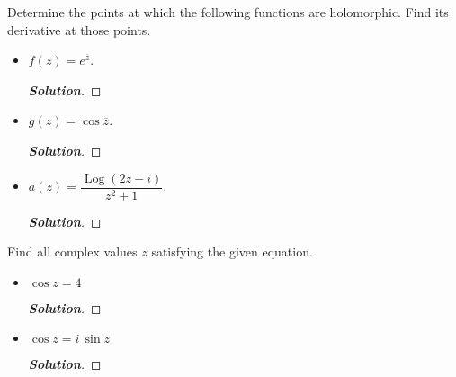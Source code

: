 \documentclass[11pt]{article}
\newenvironment{problem}[2][Problem\!]{\begin{trivlist}
\item[\hskip \labelsep {\bfseries #1}\hskip \labelsep {\bfseries #2}]}{\end{trivlist}}
\newenvironment{solution}{\begin{proof}[\textbf{\textit{Solution}}] }{\end{proof}}
\newcommand{\plog}{\operatorname{Log}}
\begin{document}
\newpage  %

\begin{problem}{5.4}
Determine the points at which the following functions are holomorphic. Find its derivative at those points.
\begin{itemize}[itemsep=3em]
\item[(a)] $f(z) = e^{\overline{z}}$.
\begin{solution}
\end{solution}

\item[(b)] $g(z) = \cos\overline{z}$.
\begin{solution}
\end{solution}

\item[(c)] $a(z) = \dfrac{\plog(2z - i)}{z^2 + 1}$.
\begin{solution}
\end{solution}

\end{itemize}
\end{problem}

\newpage  %

\begin{problem}{5.5}
Find all complex values $z$ satisfying the given equation.
\begin{itemize}[itemsep=3em]
\item[(a)] $\cos z = 4$
\begin{solution}
\end{solution}

\item[(b)] $\cos z = i\,\sin z$
\begin{solution}
\end{solution}

\end{itemize}
\end{problem}
\end{document}
